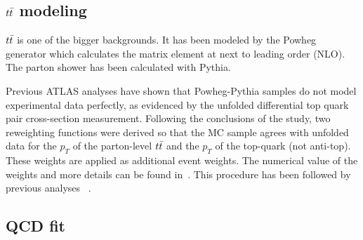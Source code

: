 \subsection{$t\bar{t}$ modeling}
$t\bar{t}$ is one of the bigger  backgrounds. It has been modeled by the Powheg generator which calculates the matrix element 
at next to leading order (NLO). The parton shower has been calculated with Pythia. 

Previous ATLAS analyses have shown that Powheg-Pythia samples do not model experimental data perfectly, as evidenced by the unfolded differential top quark pair cross-section measurement. Following the conclusions of the study, two reweighting functions were derived so that the MC sample agrees with unfolded data for the $p_{T}$ of the parton-level $t\bar{t}$ and the $p_{T}$ of the top-quark (not anti-top). These weights are applied as additional event weights. The numerical value of the weights and more details can be found in~\cite{TWikiReweighting}. This procedure has been followed by previous analyses ~\cite{Aad:2015gra}.


\subsection{QCD fit}